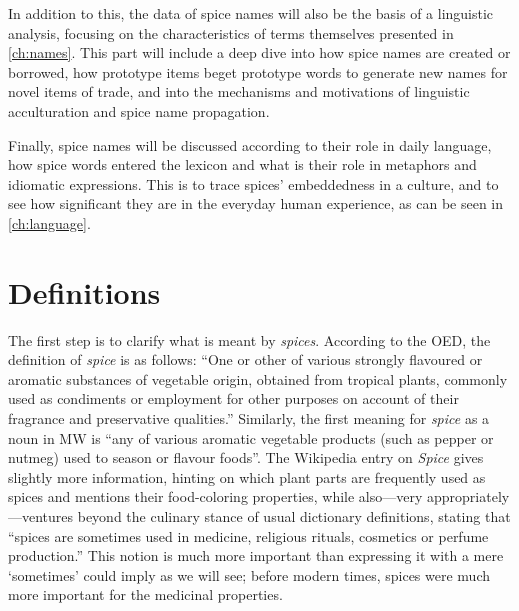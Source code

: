 In addition to this, the data of spice names will also be the basis of a linguistic analysis, focusing on the characteristics of terms themselves presented in \cref{ch:names}. This part will include a deep dive into how spice names are created or borrowed, how prototype items beget prototype words to generate new names for novel items of trade, and into the mechanisms and motivations of linguistic acculturation and spice name propagation.


Finally, spice names will be discussed according to their role in daily language, how spice words entered the lexicon and what is their role in metaphors and idiomatic expressions. This is to trace spices' embeddedness in a culture, and to see how significant they are in the everyday human experience, as can be seen in \cref{ch:language}.


\section{Definitions}
\label{sec:definitions}

The first step is to clarify what is meant by \textit{spices}. According to the \gls{OED}, the definition of \textit{spice} is as follows: ``One or other of various strongly flavoured or aromatic substances of vegetable origin, obtained from tropical plants, commonly used as condiments or employment for other purposes on account of their fragrance and preservative qualities.'' Similarly, the first meaning for \textit{spice} as a noun in \gls{MW} is ``any of various aromatic vegetable products (such as pepper or nutmeg) used to season or flavour foods''. The Wikipedia entry on \textit{Spice} gives slightly more information, hinting on which plant parts are frequently used as spices and mentions their food-coloring properties, while also---very appropriately---ventures beyond the culinary stance of usual dictionary definitions, stating that ``spices are sometimes used in medicine, religious rituals, cosmetics or perfume production.'' This notion is much more important than expressing it with a mere `sometimes' could imply as we will see; before modern times, spices were much more important for the medicinal properties.

